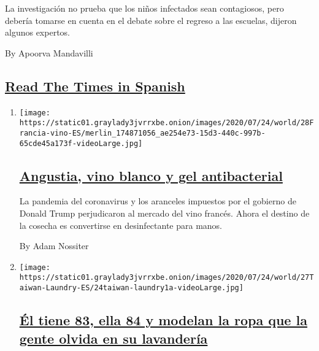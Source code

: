 \begin{enumerate}
  La investigación no prueba que los niños infectados sean contagiosos,
  pero debería tomarse en cuenta en el debate sobre el regreso a las
  escuelas, dijeron algunos expertos.

  By Apoorva Mandavilli
\end{enumerate}

\hypertarget{read-the-times-in-spanish}{%
\subsection{\texorpdfstring{\protect\hyperlink{}{Read The Times in
Spanish}}{Read The Times in Spanish}}\label{read-the-times-in-spanish}}

\begin{enumerate}
\def\labelenumi{\arabic{enumi}.}
\item
  \texttt{[image: https://static01.graylady3jvrrxbe.onion/images/2020/07/24/world/28Francia-vino-ES/merlin\_174871056\_ae254e73-15d3-440c-997b-65cde45a173f-videoLarge.jpg]}

  \hypertarget{angustia-vino-blanco-y-gel-antibacterial}{%
  \subsection{\texorpdfstring{\href{/es/2020/07/28/espanol/mundo/vino-blanco-alsacia-coronavirus.html}{Angustia,
  vino blanco y gel
  antibacterial}}{Angustia, vino blanco y gel antibacterial}}\label{angustia-vino-blanco-y-gel-antibacterial}}

  La pandemia del coronavirus y los aranceles impuestos por el gobierno
  de Donald Trump perjudicaron al mercado del vino francés. Ahora el
  destino de la cosecha es convertirse en desinfectante para manos.

  By Adam Nossiter
\item
  \texttt{[image: https://static01.graylady3jvrrxbe.onion/images/2020/07/24/world/27Taiwan-Laundry-ES/24taiwan-laundry1a-videoLarge.jpg]}

  \hypertarget{uxe9l-tiene-83-ella-84-y-modelan-la-ropa-que-la-gente-olvida-en-su-lavanderuxeda}{%
  \subsection{\texorpdfstring{\href{/es/2020/07/28/espanol/mundo/lavanderia-taiwanesa-instagram.html}{Él
  tiene 83, ella 84 y modelan la ropa que la gente olvida en su
  lavandería}}{Él tiene 83, ella 84 y modelan la ropa que la gente olvida en su lavandería}}\label{uxe9l-tiene-83-ella-84-y-modelan-la-ropa-que-la-gente-olvida-en-su-lavanderuxeda}}


\end{enumerate}
